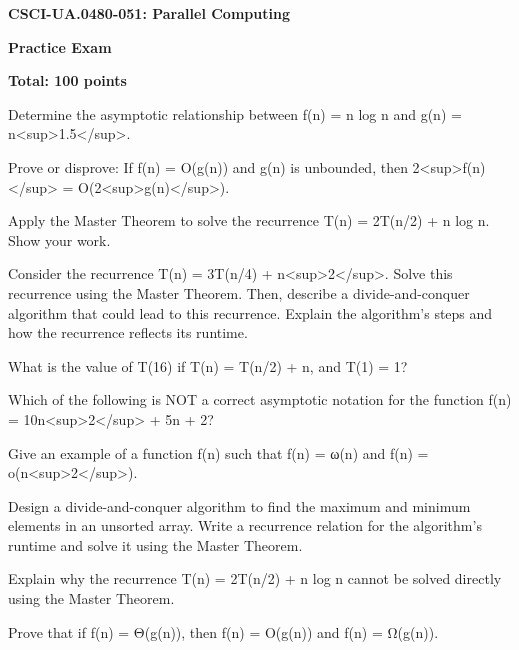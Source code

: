 \documentclass[12pt]{article}
\begin{document}
\begin{center}
{\large\bfseries CSCI-UA.0480-051: Parallel Computing}

\vspace{0.2cm}

{\normalsize\bfseries Practice Exam}

\vspace{0.1cm}

{\normalsize\bfseries Total: 100 points}
\end{center}

\vspace{0.4cm}

Determine the asymptotic relationship between f(n) = n log n and g(n) = n<sup>1.5</sup>.


\vspace{0.3cm}
Prove or disprove: If f(n) = O(g(n)) and g(n) is unbounded, then 2<sup>f(n)</sup> = O(2<sup>g(n)</sup>).


\vspace{0.3cm}
Apply the Master Theorem to solve the recurrence T(n) = 2T(n/2) + n log n.  Show your work.


\vspace{0.3cm}
Consider the recurrence T(n) = 3T(n/4) + n<sup>2</sup>.  Solve this recurrence using the Master Theorem.  Then, describe a divide-and-conquer algorithm that could lead to this recurrence.  Explain the algorithm's steps and how the recurrence reflects its runtime.


\vspace{0.3cm}
What is the value of T(16) if T(n) = T(n/2) + n, and T(1) = 1?


\vspace{0.3cm}
Which of the following is NOT a correct asymptotic notation for the function f(n) = 10n<sup>2</sup> + 5n + 2?


\vspace{0.3cm}
Give an example of a function f(n) such that f(n) = ω(n) and f(n) = o(n<sup>2</sup>).


\vspace{0.3cm}
Design a divide-and-conquer algorithm to find the maximum and minimum elements in an unsorted array.  Write a recurrence relation for the algorithm's runtime and solve it using the Master Theorem.


\vspace{0.3cm}
Explain why the recurrence T(n) = 2T(n/2) + n log n cannot be solved directly using the Master Theorem.


\vspace{0.3cm}
Prove that if f(n) = Θ(g(n)), then f(n) = O(g(n)) and f(n) = Ω(g(n)).
\end{document}
